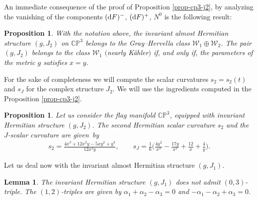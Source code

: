 \documentclass[pdftex]{sigma}%
\numberwithin{equation}{section}
\newtheorem{Lemma}[Theorem]{Lemma}
\newtheorem{Proposition}[Theorem]{Proposition}
 { \theoremstyle{definition}
\newtheorem{Definition}[Theorem]{Definition}
\newtheorem{Question}[Theorem]{Question}
\newtheorem*{Notation}{Notation}
\newtheorem{Example}[Theorem]{Example}
\newtheorem{Remark}[Theorem]{Remark} }
\begin{document}
An immediate consequence of the proof of Proposition \ref{prop-cp3-j2}, by analyzing the vanishing of the components $({\rm d}F)^{-}$, $({\rm d}F)^{+}$, $N^0$ is the following result:
\begin{Proposition}
With the notation above, the invariant almost Hermitian structure $(g, J_{2})$ on $\mathbb{CP}^3$ belongs to the Gray--Hervella class $\mathcal{W}_{1}\oplus \mathcal{W}_{2}$. The pair $(g, J_{2})$ belongs to the class $\mathcal{W}_{1}$ $($nearly K\"ahler$)$ if, and only if, the parameters of the metric $g$ satisfies $x=y$.
\end{Proposition}

For the sake of completeness we will compute the scalar curvatures $s_2=s_{2}(t)$ and $s_J$ for the complex structure $J_2$. We will use the ingredients computed in the Proposition \ref{prop-cp3-j2}.

\begin{Proposition}
Let us consider the flag manifold $\mathbb{CP}^3$, equipped with invariant Hermitian structure $(g, J_{2})$. The second Hermitian scalar curvature $s_2$ and the $J$-scalar curvature are given~by
\begin{gather*}
s_{2}=\frac{4 x^3+12 x^2 y-5 x y^2+y^3}{12 x^3 y},
\qquad
s_{J}=\frac{1}{6} \bigg(\frac{4 y^2}{x^3}-\frac{17 y}{x^2}+\frac{12}{x}+\frac{4}{y}\bigg).
\end{gather*}
\end{Proposition}

Let us deal now with the invariant almost Hermitian structure $(g, J_{1})$.

\begin{Lemma}
The invariant Hermitian structure $(g, J_{1})$ does not admit $(0,3)$-triple. The $(1,2)$-triples are given by $\alpha_{1}+\alpha_{2}-\alpha_{3}=0$ and $-\alpha_{1}-\alpha_{2}+\alpha_{3}=0$.
\end{Lemma}
\end{document}
